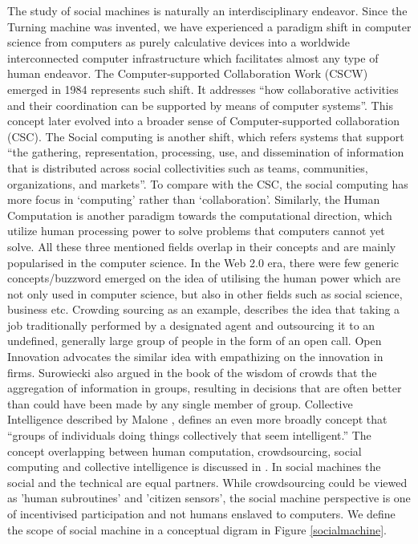\documentclass{sig-alternate}
\begin{document}
The study of social machines is naturally an interdisciplinary endeavor. Since the Turning machine was invented, we have experienced a paradigm shift in computer science from computers as purely calculative devices into a worldwide interconnected computer infrastructure which facilitates almost any type of human endeavor. The Computer-supported Collaboration Work (CSCW) \cite{grudin1994computer} emerged in 1984 represents such shift. It addresses ``how collaborative activities and their coordination can be supported by means of computer systems''. This concept later evolved into a broader sense of  Computer-supported collaboration (CSC). The Social computing \cite{parameswaran2007research} is another shift, which refers systems that support ``the gathering, representation, processing, use, and dissemination of information that is distributed across social collectivities such as teams, communities, organizations, and markets''. To compare with the CSC, the social computing has more focus in `computing' rather than `collaboration'. Similarly, the Human Computation \cite{von2009human} is another paradigm towards the computational direction, which utilize human processing power to solve problems that computers cannot yet solve. All these three mentioned fields overlap in their concepts and are mainly popularised in the computer science. In the Web 2.0 era, there were few generic concepts/buzzword emerged on the idea of utilising the human power which are not only used in computer science, but also in other fields such as social science, business etc. Crowding sourcing \cite{howe2006crowdsourcing} as an example, describes the idea that taking a job traditionally performed by a designated agent and outsourcing it to an undefined, generally large group of people in the form of an open call. Open Innovation \cite{chesbrough2008open} advocates the similar idea with empathizing on the innovation in firms. Surowiecki also argued in the book of the wisdom of crowds \cite{surowiecki2005wisdom} that the aggregation of information in groups, resulting in decisions that are often better than could have been made by any single member of group. Collective Intelligence described by Malone \cite{malone2009harnessing}, defines an even more broadly concept that ``groups of individuals doing things collectively that seem intelligent.''
The concept overlapping between human computation, crowdsourcing, social computing and collective intelligence is discussed in \cite{quinn2011human}.
In  social machines  the  social and  the  technical are equal  partners. While  crowdsourcing  could  be  viewed  as  'human  subroutines'  and  'citizen  sensors',  the social machine perspective is one of incentivised participation and not humans enslaved to computers. We define the scope of social machine in a conceptual digram in Figure \ref{socialmachine}.
\end{document}
